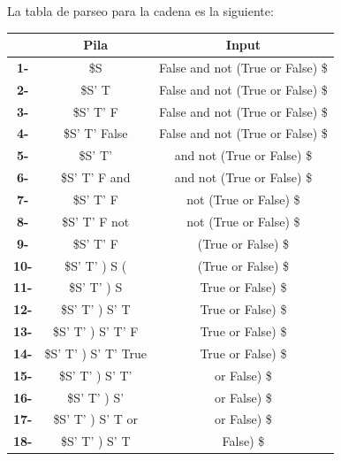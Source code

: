 \documentclass[12pt, letterpaper]{article}
\begin{document}
\begin{enumerate}
\begin{enumerate}[label=(\alph*)]
\begin{enumerate}[label=(\alph*)]
    La tabla de parseo para la cadena es la siguiente:
    \begin{table}[H]
      \centering
      \begin{tabular}{|c|c|c|}
        \hline
        & \textbf{Pila}         & \textbf{Input}                   \\ \hline
        \textbf{1-}  & \$S                   & False and not (True or False) \$ \\ \hline
        \textbf{2-}  & \$S' T                & False and not (True or False) \$ \\ \hline
        \textbf{3-}  & \$S' T' F             & False and not (True or False) \$ \\ \hline
        \textbf{4-}  & \$S' T' False         & False and not (True or False) \$ \\ \hline
        \textbf{5-}  & \$S' T'               & and not (True or False) \$       \\ \hline
        \textbf{6-}  & \$S' T' F and         & and not (True or False) \$       \\ \hline
        \textbf{7-}  & \$S' T' F             & not (True or False) \$           \\ \hline
        \textbf{8-}  & \$S' T' F not         & not (True or False) \$           \\ \hline
        \textbf{9-}  & \$S' T' F             & (True or False) \$               \\ \hline
        \textbf{10-} & \$S' T' ) S (         & (True or False) \$               \\ \hline
        \textbf{11-} & \$S' T' ) S           & True or False) \$                \\ \hline
        \textbf{12-} & \$S' T' ) S' T        & True or False) \$                \\ \hline
        \textbf{13-} & \$S' T' ) S' T' F     & True or False) \$                \\ \hline
        \textbf{14-} & \$S' T' ) S' T' True  & True or False) \$                \\ \hline
        \textbf{15-} & \$S' T' ) S' T'       & or False) \$                     \\ \hline
        \textbf{16-} & \$S' T' ) S'          & or False) \$                     \\ \hline
        \textbf{17-} & \$S' T' ) S' T or     & or False) \$                     \\ \hline
        \textbf{18-} & \$S' T' ) S' T        & False) \$                        \\ \hline

\end{tabular}
\end{table}
\end{enumerate}
\end{enumerate}
\end{enumerate}
\end{document}
